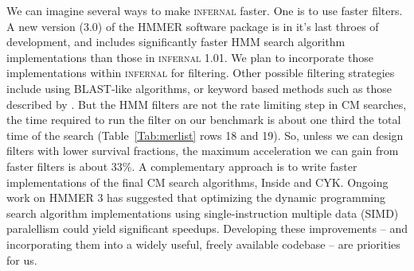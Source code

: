 We can imagine several ways to make \textsc{infernal} faster. One is
to use faster filters. A new version (3.0) of the \textsc{HMMER}
software package is in it's last throes of development, and includes
significantly faster HMM search algorithm implementations than those
in \textsc{infernal} 1.01. We plan to incorporate those
implementations within \textsc{infernal} for filtering.  Other
possible filtering strategies include using BLAST-like
algorithms, or keyword based methods such as those described by
\citet{ZhangBafna06}. But the HMM filters are not the rate limiting
step in CM searches, the time required to run the filter on our
benchmark is about one third the total time of the search
(Table~\ref{Tab:merlist} rows 18 and 19).  So, unless we can design filters
with lower survival fractions, the maximum acceleration we can gain
from faster filters is about 33\%.  A complementary approach is to
write faster implementations of the final CM search algorithms, Inside
and CYK.  Ongoing work on \textsc{HMMER} 3 has suggested that
optimizing the dynamic programming search algorithm implementations
using single-instruction multiple data (SIMD) paralellism could yield
significant speedups.
Developing these improvements -- and incorporating
them into a widely useful, freely available codebase -- are priorities
for us.


\begin{comment}
The slow speed of CM searches been the most serious obstacle to the
use of the \textsc{infernal} software for annotating RNAs in databases
and genomes. Without using filters, running the most sensitive CM
search algorithm with \textsc{infernal} version 1.01 required about
1700 hours to complete our benchmark search of 51 families against
both strands of a 10 Mb database. We have shown that by combining FST
calibrated HMM filters and QDB CYK filters with $F$ and $\beta$
parameters that do not significantly compromise specificity or
sensitivity, the running time drops about 100-fold to about 16
hours. Eventually, we want to be able to use \textsc{infernal} to
annotate RNAs in large genomes in at most a few days. To run the 1371
\textsc{Rfam} release 9.1 families against the entire human genome
would require about 15 CPU years (down from 800 CPU years with
\textsc{infernal} 0.72).
%
\end{comment}


